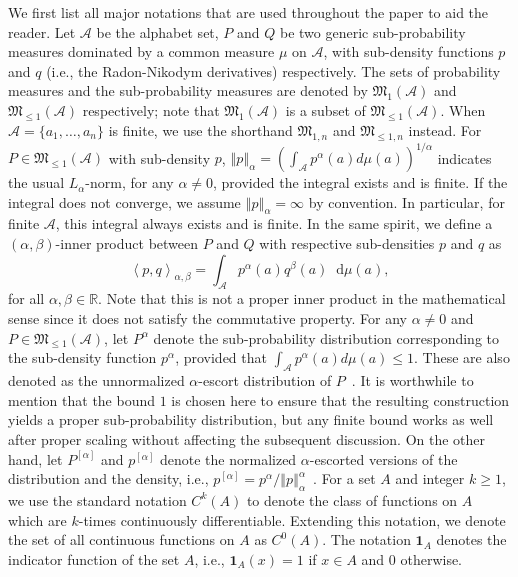 \documentclass[11pt]{article}
\theoremstyle{plain}
\theoremstyle{remark}
\newcommand{\dd}{\mathop{}\!\mathrm{d}}
\def\R{\mathbb{R}}
\newcommand{\Acal}{\mathcal{A}}
\newcommand{\Mfrak}{\mathfrak{M}}
\newcommand{\ind}[1]{\boldsymbol{1}_{#1} }
\newcommand{\norm}[1]{\left\Vert #1 \right\Vert}
\newcommand{\inner}[1]{\left\langle #1\right\rangle}
\begin{document}
We first list all major notations that are used throughout the paper to aid the reader. Let $\Acal$ be the alphabet set, $P$ and $Q$ be two generic sub-probability measures dominated by a common measure $\mu$ on $\Acal$, with sub-density functions $p$ and $q$ (i.e., the Radon-Nikodym derivatives) respectively. The sets of probability measures and the sub-probability measures are denoted by $\Mfrak_{1}(\Acal)$ and $\Mfrak_{\leq 1}(\Acal)$ respectively; note that $\Mfrak_{1}(\Acal)$ is a subset of $\Mfrak_{\leq 1}(\Acal)$. When $\Acal = \{a_1, \dots, a_n\}$ is finite, we use the shorthand $\Mfrak_{1,n}$ and $\Mfrak_{\leq 1, n}$ instead. For $P \in \Mfrak_{\leq 1}(\Acal)$ with sub-density $p$, $\norm{p}_\alpha = (\int_{\Acal} p^\alpha(a)d\mu(a))^{1/\alpha}$ indicates the usual $L_\alpha$-norm, for any $\alpha \neq 0$, provided the integral exists and is finite. If the integral does not converge, we assume $\norm{p}_\alpha = \infty$ by convention. In particular, for finite $\Acal$, this integral always exists and is finite. In the same spirit, we define a $(\alpha,\beta)$-inner product between $P$ and $Q$ with respective sub-densities $p$ and $q$ as
\begin{equation*}
    \inner{p, q}_{\alpha,\beta} = \int_{\Acal} p^\alpha(a) q^\beta(a) \dd\mu(a),
\end{equation*}
\noindent for all $\alpha,\beta \in \R$. Note that this is not a proper inner product in the mathematical sense since it does not satisfy the commutative property. For any $\alpha \neq 0$ and $P \in \Mfrak_{\leq 1}(\Acal)$, let $P^\alpha$ denote the sub-probability distribution corresponding to the sub-density function $p^\alpha$, provided that $\int_{\Acal} p^\alpha(a) d\mu(a) \leq 1$. These are also denoted as the unnormalized $\alpha$-escort distribution of $P$~\citep{cichocki2010families}. It is worthwhile to mention that the bound $1$ is chosen here to ensure that the resulting construction yields a proper sub-probability distribution, but any finite bound works as well after proper scaling without affecting the subsequent discussion. On the other hand, let $P^{[\alpha]}$ and $p^{[\alpha]}$ denote the normalized $\alpha$-escorted versions of the distribution and the density, i.e., $p^{[\alpha]} = p^\alpha/\norm{p}_\alpha^\alpha$~\citep{bercher2010escort, kalogeropoulos2012escort}. For a set $A$ and integer $k \geq 1$, we use the standard notation $C^k(A)$ to denote the class of functions on $A$ which are $k$-times continuously differentiable. Extending this notation, we denote the set of all continuous functions on $A$ as $C^0(A)$. The notation $\ind{A}$ denotes the indicator function of the set $A$, i.e., $\ind{A}(x) = 1$ if $x \in A$ and $0$ otherwise.
\end{document}
